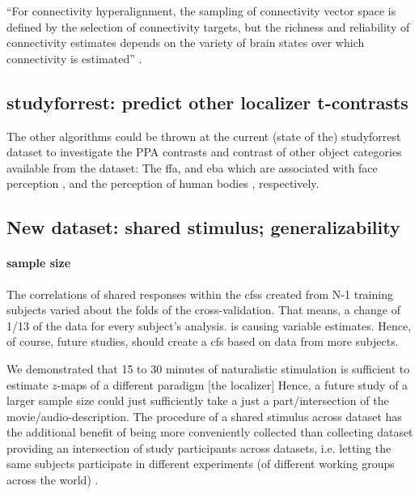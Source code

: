 ``For connectivity hyperalignment, the sampling of connectivity vector space is
defined by the selection of connectivity targets, but the richness and
reliability of connectivity estimates depends on the variety of brain states
over which connectivity is estimated'' \citep{haxby2020hyperalignment}.


\subsection{studyforrest: predict other localizer t-contrasts}


%
The other algorithms could be thrown at the current (state of the) studyforrest
dataset to investigate the PPA contrasts and contrast of other object categories
available from the dataset:
%
The \ac{ffa}, and \ac{eba}  which are associated with face perception
\citep{kanwisher1997ffa, pitcher2011occipitalfacearea}, and the perception of
human bodies \citep{downing2001bodyarea}, respectively.


\subsection{New dataset: shared stimulus; generalizability}

\paragraph{sample size}



The correlations of shared responses within the \acp{cfs} created from N-1
training subjects varied about the folds of the cross-validation.
That means, a change of 1/13 of the data for every subject's analysis.
is causing variable estimates.
Hence, of course, future studies, should create a \ac{cfs} based on data from
more subjects.


%
We demonstrated that 15 to 30 minutes of naturalistic stimulation is sufficient
to estimate $z$-maps of a different paradigm [the localizer]
%
Hence, a future study of a larger sample size could just sufficiently take a
just a part/intersection of the movie/audio-description.
%
The procedure of a shared stimulus across dataset has the additional benefit of
being more conveniently collected than collecting dataset providing an
intersection of study participants across datasets, i.e. letting the same
subjects participate in different experiments (of different working groups
across the world) \citep[(s.][ for an \ac{srm} based on "shared subjects acrpss
datasets]{zhang2018transfer}.


